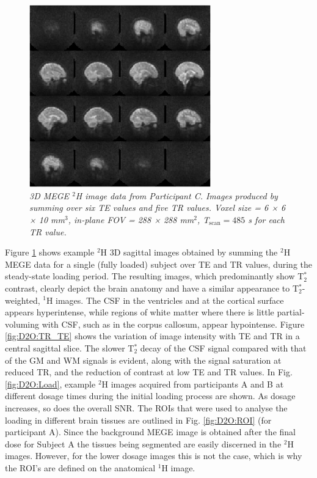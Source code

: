 \begin{figure}[H]
    \centering
    \includegraphics[width=0.7\textwidth]{Figures/D2O/Sag_Full.png}
    \caption{\textit{3D MEGE $^2$H image data from Participant C. Images produced by summing over six \ac{TE} values and five \ac{TR} values. Voxel size = 6 × 6 × 10 mm$^3$, in-plane \ac{FOV} = 288 × 288 mm$^2$, T$_\textrm{scan}=485$ s for each \ac{TR} value.}}
    \label{fig:D2O:Sag_Full}
\end{figure}

Figure \ref{fig:D2O:Sag_Full} shows example $^2$H 3D sagittal images obtained by summing the $^2$H \ac{MEGE} data for a single (fully loaded) subject over \ac{TE} and \ac{TR} values, during the steady-state loading period. The resulting images, which predominantly show T$_2^*$ contrast, clearly depict the brain anatomy and have a similar appearance to T$_2^*$-weighted, $^1$H images. The \ac{CSF} in the ventricles and at the cortical surface appears hyperintense, while regions of white matter where there is little partial-voluming with \ac{CSF}, such as in the corpus callosum, appear hypointense. Figure \ref{fig:D2O:TR_TE} shows the variation of image intensity with TE and TR in a central sagittal slice. The slower T$_2^*$ decay of the CSF signal compared with that of the \ac{GM} and \ac{WM} signals is evident, along with the signal saturation at reduced \ac{TR}, and the reduction of contrast at low \ac{TE} and \ac{TR} values. In Fig. \ref{fig:D2O:Load}, example $^2$H images acquired from participants A and B at different dosage times during the initial loading process are shown. As dosage increases, so does the overall \ac{SNR}. The \ac{ROI}s that were used to analyse the loading in different brain tissues are outlined in Fig. \ref{fig:D2O:ROI} (for participant A). Since the background \ac{MEGE} image is obtained after the final dose for Subject A the tissues being segmented are easily discerned in the $^2$H images. However, for the lower dosage images this is not the case, which is why the \ac{ROI}’s are defined on the anatomical $^1$H image. 

